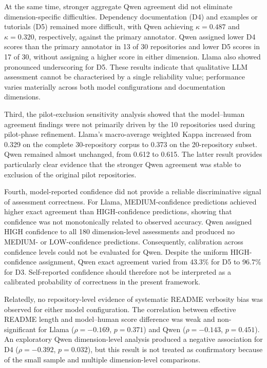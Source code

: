 At the same time, stronger aggregate Qwen agreement did not eliminate
dimension-specific difficulties. Dependency documentation (D4) and
examples or tutorials (D5) remained more difficult, with Qwen
achieving $\kappa=0.487$ and $\kappa=0.320$, respectively, against
the primary annotator. Qwen assigned lower D4 scores than the primary
annotator in 13 of 30 repositories and lower D5 scores in 17 of 30,
without assigning a higher score in either dimension. Llama also
showed pronounced underscoring for D5. These results indicate that
qualitative LLM assessment cannot be characterised by a single
reliability value; performance varies materially across both model
configurations and documentation dimensions.

Third, the pilot-exclusion sensitivity analysis showed that the
model--human agreement findings were not primarily driven by the
10 repositories used during pilot-phase refinement. Llama's
macro-average weighted Kappa increased from 0.329 on the complete
30-repository corpus to 0.373 on the 20-repository subset. Qwen
remained almost unchanged, from 0.612 to 0.615. The latter result
provides particularly clear evidence that the stronger Qwen agreement
was stable to exclusion of the original pilot repositories.

Fourth, model-reported confidence did not provide a reliable
discriminative signal of assessment correctness. For Llama,
MEDIUM-confidence predictions achieved higher exact agreement than
HIGH-confidence predictions, showing that confidence was not
monotonically related to observed accuracy. Qwen assigned HIGH
confidence to all 180 dimension-level assessments and produced no
MEDIUM- or LOW-confidence predictions. Consequently, calibration
across confidence levels could not be evaluated for Qwen. Despite
the uniform HIGH-confidence assignment, Qwen exact agreement varied
from 43.3\% for D5 to 96.7\% for D3. Self-reported confidence should
therefore not be interpreted as a calibrated probability of
correctness in the present framework.

Relatedly, no repository-level evidence of systematic README
verbosity bias was observed for either model configuration.
The correlation between effective README length and model--human score difference was weak
and non-significant for Llama ($\rho=-0.169$, $p=0.371$) and Qwen
($\rho=-0.143$, $p=0.451$). An exploratory Qwen dimension-level
analysis produced a negative association for D4
($\rho=-0.392$, $p=0.032$), but this result is not treated as
confirmatory because of the small sample and multiple
dimension-level comparisons.

